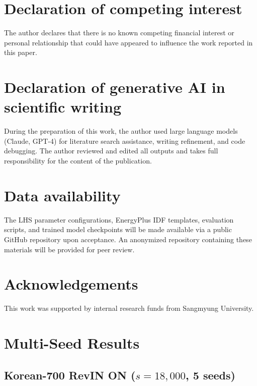 \documentclass[preprint,12pt,authoryear]{elsarticle}
\begin{document}
\section*{Declaration of competing interest}
The author declares that there is no known competing financial interest or personal relationship that could have appeared to influence the work reported in this paper.

\section*{Declaration of generative AI in scientific writing}
During the preparation of this work, the author used large language models (Claude, GPT-4) for literature search assistance, writing refinement, and code debugging. The author reviewed and edited all outputs and takes full responsibility for the content of the publication.

\section*{Data availability}
The LHS parameter configurations, EnergyPlus IDF templates, evaluation scripts, and trained model checkpoints will be made available via a public GitHub repository upon acceptance. An anonymized repository containing these materials will be provided for peer review.

\section*{Acknowledgements}
This work was supported by internal research funds from Sangmyung University.




\appendix

\section{Multi-Seed Results}
\label{app:seeds}

\subsection{Korean-700 RevIN ON ($s = 18{,}000$, 5 seeds)}
\end{document}
